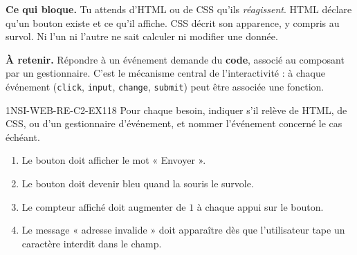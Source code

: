 

\textbf{Ce qui bloque.} Tu attends d'HTML ou de CSS qu'ils \emph{réagissent}. HTML déclare
qu'un bouton existe et ce qu'il affiche. CSS décrit son apparence, y compris au survol. Ni
l'un ni l'autre ne sait calculer ni modifier une donnée.

\textbf{À retenir.} Répondre à un événement demande du \textbf{code}, associé au composant par
un gestionnaire. C'est le mécanisme central de l'interactivité : à chaque événement
(\lstinline{click}, \lstinline{input}, \lstinline{change}, \lstinline{submit}) peut être
associée une fonction.

\begin{exercice}{1NSI-WEB-RE-C2-EX1}{1}{8}
Pour chaque besoin, indiquer s'il relève de HTML, de CSS, ou d'un gestionnaire d'événement,
et nommer l'événement concerné le cas échéant.
\begin{enumerate}
  \item Le bouton doit afficher le mot « Envoyer ».
  \item Le bouton doit devenir bleu quand la souris le survole.
  \item Le compteur affiché doit augmenter de $1$ à chaque appui sur le bouton.
  \item Le message « adresse invalide » doit apparaître dès que l'utilisateur tape un caractère
        interdit dans le champ.
\end{enumerate}
\end{exercice}

